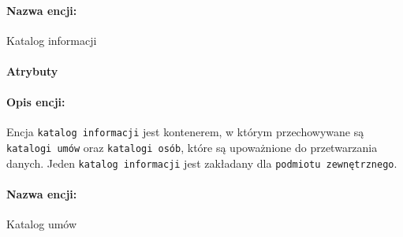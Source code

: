 \documentclass{article}
\begin{document}
\paragraph{Nazwa encji:\\ }
Katalog informacji
\paragraph{Atrybuty\\ }
\begin{table}[H]

\caption{Tabela z opisem encji.} 
\end{table}
\paragraph{Opis encji: \\}
Encja \texttt{katalog informacji} jest kontenerem, w którym przechowywane są \texttt{katalogi umów} oraz \texttt{katalogi osób}, które są upoważnione do przetwarzania danych. Jeden \texttt{katalog informacji} jest zakładany dla \texttt{podmiotu zewnętrznego}.
\paragraph{Nazwa encji:\\ }
Katalog umów
\end{document}
